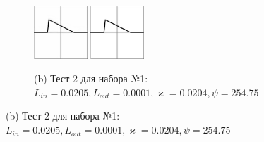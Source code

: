 \documentclass{beamer}
\renewcommand{\kappa}{\varkappa}
\begin{document}
\begin{frame}
\begin{figure}[!hp]
\begin{subfigure}{\textwidth}
			\hfill
			\includegraphics[width=0.22\textwidth]{res_n1_4}
			\hfill
			\includegraphics[width=0.22\textwidth]{2}
			\caption*{\small (b) Тест 2 для набора №1: $L_{in} = 0.0205, 
				L_{out} = 0.0001,
				\kappa = 0.0204,
				\psi = 254.75
				$}
		\end{subfigure}
	\end{figure}
\end{frame}
\end{document}
